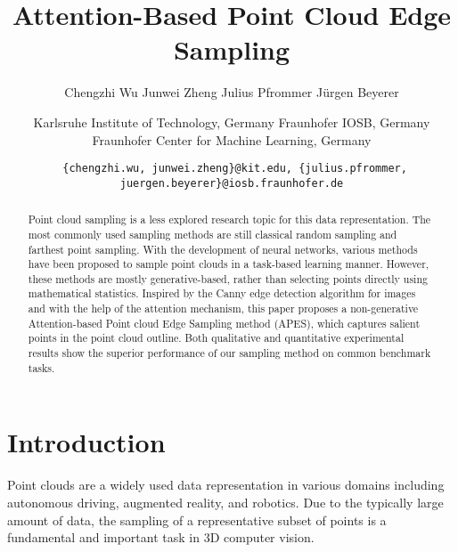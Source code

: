\documentclass[10pt,twocolumn,letterpaper]{article}
\begin{document}
\title{\vspace{-0.2cm} Attention-Based Point Cloud Edge Sampling}

\author{Chengzhi Wu \quad Junwei Zheng
\quad Julius Pfrommer \quad Jürgen Beyerer \and
Karlsruhe Institute of Technology, Germany \quad
Fraunhofer IOSB, Germany\\
Fraunhofer Center for Machine Learning, Germany \vspace{-0.2cm}
\and
{\tt\footnotesize
\{chengzhi.wu, junwei.zheng\}@kit.edu, \quad \{julius.pfrommer, juergen.beyerer\}@iosb.fraunhofer.de}
\vspace{-0.1cm}}

\maketitle

\begin{abstract}
Point cloud sampling is a less explored research topic for this data representation. The most commonly used sampling methods are still classical random sampling and farthest point sampling. With the development of neural networks, various methods have been proposed to sample point clouds in a task-based learning manner. However, these methods are mostly generative-based, rather than selecting points directly using mathematical statistics. Inspired by the Canny edge detection algorithm for images and with the help of the attention mechanism, this paper proposes a non-generative Attention-based Point cloud Edge Sampling method (APES), which captures salient points in the point cloud outline. Both qualitative and quantitative experimental results show the superior performance of our sampling method on common benchmark tasks. 
\vspace{-0.2cm}
\end{abstract}


\section{Introduction}
\label{sec:intro}
Point clouds are a widely used data representation in various domains including autonomous driving, augmented reality, and robotics. Due to the typically large amount of data, the sampling of a representative subset of points is a fundamental and important task in 3D computer vision.
\end{document}
